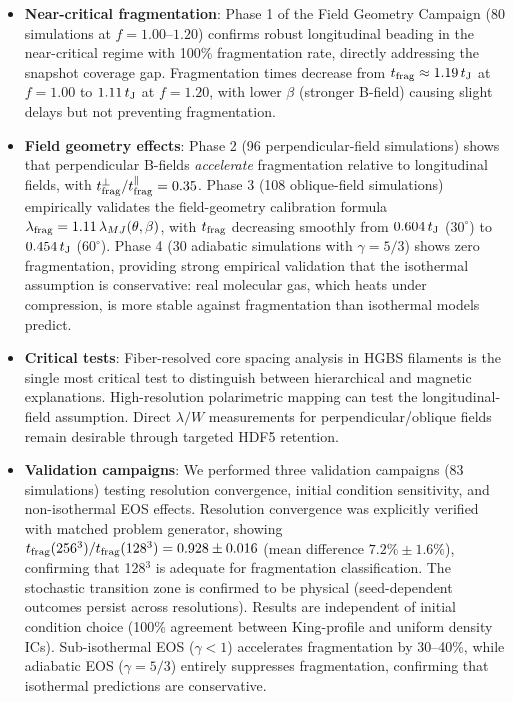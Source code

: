 \documentclass[twoside,twocolumn]{mnras}
\begin{document}
\begin{itemize}
    \item \textbf{Near-critical fragmentation}: Phase 1 of the Field Geometry Campaign (80 simulations at $f = 1.00$--$1.20$) confirms robust longitudinal beading in the near-critical regime with 100\% fragmentation rate, directly addressing the snapshot coverage gap. Fragmentation times decrease from $t_{\rm frag} \approx 1.19\,t_{\rm J}$ at $f = 1.00$ to $1.11\,t_{\rm J}$ at $f = 1.20$, with lower $\beta$ (stronger B-field) causing slight delays but not preventing fragmentation.

    \item \textbf{Field geometry effects}: Phase 2 (96 perpendicular-field simulations) shows that perpendicular B-fields {\it accelerate} fragmentation relative to longitudinal fields, with $t_{\rm frag}^{\perp} / t_{\rm frag}^{\parallel} = 0.35$. Phase 3 (108 oblique-field simulations) empirically validates the field-geometry calibration formula $\lambda_{\rm frag} = 1.11\,\lambda_{MJ}(\theta, \beta)$, with $t_{\rm frag}$ decreasing smoothly from $0.604\,t_{\rm J}$ ($30^\circ$) to $0.454\,t_{\rm J}$ ($60^\circ$). Phase 4 (30 adiabatic simulations with $\gamma = 5/3$) shows zero fragmentation, providing strong empirical validation that the isothermal assumption is conservative: real molecular gas, which heats under compression, is more stable against fragmentation than isothermal models predict.

    \item \textbf{Critical tests}: Fiber-resolved core spacing analysis in HGBS filaments is the single most critical test to distinguish between hierarchical and magnetic explanations. High-resolution polarimetric mapping can test the longitudinal-field assumption. Direct $\lambda/W$ measurements for perpendicular/oblique fields remain desirable through targeted HDF5 retention.

    \item \textbf{Validation campaigns}: We performed three validation campaigns (83 simulations) testing resolution convergence, initial condition sensitivity, and non-isothermal EOS effects. Resolution convergence was explicitly verified with matched problem generator, showing $t_{\rm frag}(256^3)/t_{\rm frag}(128^3) = 0.928 \pm 0.016$ (mean difference $7.2\% \pm 1.6\%$), confirming that 128$^3$ is adequate for fragmentation classification. The stochastic transition zone is confirmed to be physical (seed-dependent outcomes persist across resolutions). Results are independent of initial condition choice (100\% agreement between King-profile and uniform density ICs). Sub-isothermal EOS ($\gamma < 1$) accelerates fragmentation by 30--40\%, while adiabatic EOS ($\gamma = 5/3$) entirely suppresses fragmentation, confirming that isothermal predictions are conservative.
\end{itemize}
\end{document}
